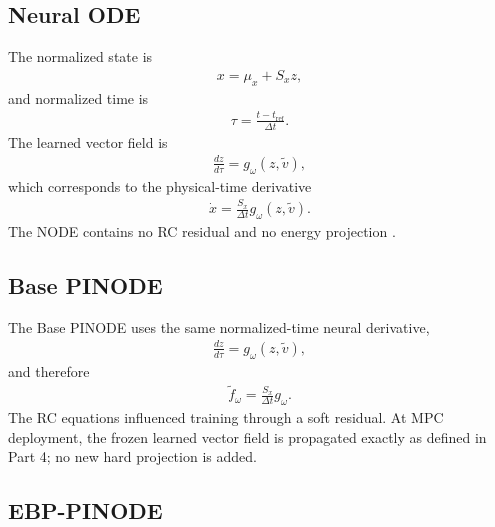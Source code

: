 \documentclass[11pt]{article}
\newcommand{\dt}{\Delta t}
\begin{document}
\subsection{Neural ODE}

The normalized state is
\begin{align}
x=\mu_x+S_xz,
\end{align}
and normalized time is
\begin{align}
\boxed{
\tau=\frac{t-t_{\mathrm{ref}}}{\dt}.
}
\tag{6.9}
\end{align}
The learned vector field is
\begin{align}
\boxed{
\frac{dz}{d\tau}
=
g_\omega(z,\widetilde v),
}
\tag{6.10}
\end{align}
which corresponds to the physical-time derivative
\begin{align}
\boxed{
\dot x
=
\frac{S_x}{\dt}
g_\omega(z,\widetilde v).
}
\tag{6.11}
\end{align}
The NODE contains no RC residual and no energy projection
\citep{chen2018node}.

\subsection{Base PINODE}

The Base PINODE uses the same normalized-time neural derivative,
\begin{align}
\boxed{
\frac{dz}{d\tau}=g_\omega(z,\widetilde v),
}
\tag{6.12}
\end{align}
and therefore
\begin{align}
\boxed{
\widetilde f_\omega
=
\frac{S_x}{\dt}g_\omega.
}
\tag{6.13}
\end{align}
The RC equations influenced training through a soft residual.  At MPC deployment, the frozen
learned vector field is propagated exactly as defined in Part 4; no new hard projection is added.

\subsection{EBP-PINODE}
\end{document}
